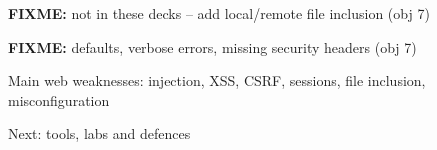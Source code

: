 \documentclass[Screen16to9,17pt]{foils}
\begin{document}

\myquestionspage

\begin{list2}
\item \textbf{FIXME:} not in these decks -- add local/remote file inclusion (obj 7)
\end{list2}

\begin{list2}
\item \textbf{FIXME:} defaults, verbose errors, missing security headers (obj 7)
\end{list2}

\begin{list2}
\item Main web weaknesses: injection, XSS, CSRF, sessions, file inclusion, misconfiguration
\item Next: tools, labs and defences
\end{list2}
\end{document}
